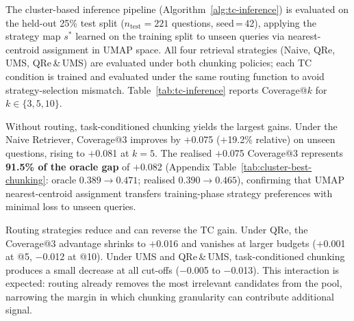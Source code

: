 The cluster-based inference pipeline (Algorithm~\ref{alg:tc-inference}) is
evaluated on the held-out 25\% test split ($n_{\text{test}}{=}221$ questions,
seed\,=\,42), applying the strategy map $s^*$ learned on the training split to
unseen queries via nearest-centroid assignment in UMAP space.
All four retrieval strategies (Naive, QRe, UMS, QRe\,\&\,UMS) are evaluated
under both chunking policies; each TC condition is trained and evaluated under
the same routing function to avoid strategy-selection mismatch.
Table~\ref{tab:tc-inference} reports Coverage@$k$ for $k \in \{3,5,10\}$.

Without routing, task-conditioned chunking yields the largest gains. Under the Naive Retriever, Coverage@3 improves by $+$0.075 ($+$19.2\% relative)
on unseen questions, rising to $+$0.081 at $k{=}5$.
The realised $+$0.075 Coverage@3 represents \textbf{91.5\% of the oracle gap}
of $+$0.082 (Appendix Table~\ref{tab:cluster-best-chunking}: oracle $0.389 \to 0.471$;
realised $0.390 \to 0.465$), confirming that UMAP nearest-centroid assignment
transfers training-phase strategy preferences with minimal loss to unseen queries.

Routing strategies reduce and can reverse the TC gain. Under QRe, the Coverage@3 advantage shrinks to $+$0.016 and vanishes at larger
budgets ($+$0.001 at @5, $-$0.012 at @10).
Under UMS and QRe\,\&\,UMS, task-conditioned chunking produces a small decrease at all cut-offs ($-$0.005 to $-$0.013).
This interaction is expected: routing already removes the most irrelevant
candidates from the pool, narrowing the margin in which chunking granularity
can contribute additional signal.

